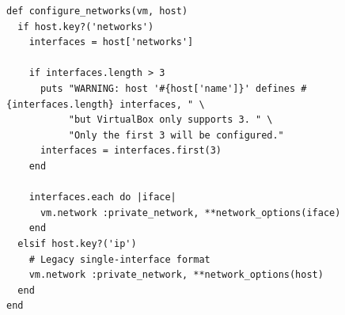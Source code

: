 \begin{codeblock}
    \begin{verbatim}
def configure_networks(vm, host)
  if host.key?('networks')
    interfaces = host['networks']

    if interfaces.length > 3
      puts "WARNING: host '#{host['name']}' defines #{interfaces.length} interfaces, " \
           "but VirtualBox only supports 3. " \
           "Only the first 3 will be configured."
      interfaces = interfaces.first(3)
    end

    interfaces.each do |iface|
      vm.network :private_network, **network_options(iface)
    end
  elsif host.key?('ip')
    # Legacy single-interface format
    vm.network :private_network, **network_options(host)
  end
end
\end{verbatim}
    \caption[``\texttt{configure\_networks()}'' in de aangepaste ``\texttt{Vagrantfile}'']
    {De ``\texttt{configure\_networks()}''-functie ondersteunt twee formaten: het
        oorspronkelijke formaat met één IP-adres per host (achterwaarts compatibel),
        en een ``\texttt{networks}''-sleutel voor meerdere interfaces (max. 3).}
    \label{code:configure_networks}
\end{codeblock}